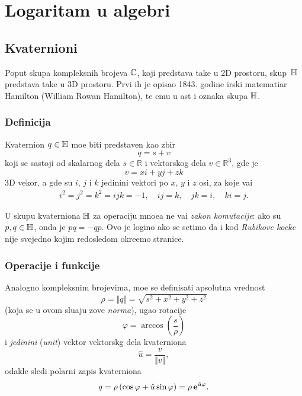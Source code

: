 

\section{Logaritam u algebri}

\subsection{Kvaternioni}

\def\uv{{\hat u}}
\def\vp{{\vec v}}
\def\norm#1{{\Vert#1\Vert}}

Poput skupa kompleksnih brojeva ${\mathbb C}$, koji predstav{\lj}a ta{\cv}ke u 2D prostoru,
skup~${\mathbb H}$ predstav{\lj}a ta{\cv}ke u 3D prostoru. Prvi ih je opisao 
1843. godine irski ma\-te\-ma\-ti\-{\cv}ar
Hamilton (William Rowan Hamilton), te {\nj}emu u {\cv}ast i oznaka skupa ${\mathbb H}$.

\subsubsection{Definicija}

Kvaternion $q\in{\mathbb H}$ mo{\zv}e biti predstav{\lj}en kao zbir
\begin{equation}
    q=s+v
\end{equation}
koji se sastoji od skalarnog dela $s\in{\mathbb R}$ i vektorskog dela $v\in{\mathbb R}^3$, gde je
\begin{equation}
    v=xi+yj+zk
\end{equation}
3D vekor, a gde su $i$, $j$ i $k$ jedini{\cv}ni vektori po $x$, $y$ i $z$ osi,
za koje va{\zv}i
\begin{gather}    
    i^2=j^2=k^2=ijk=-1,\quad
    ij=k,\quad jk=i,\quad ki=j. 
\end{gather}

\danger U skupu kvaterniona ${\mathbb H}$ za operaciju mno{\zv}e{\nj}a ne va{\zv}i {\sl zakon komutacije}: ako su
$p,q\in{\mathbb H}$, onda je $pq=-qp$. Ovo je logi{\cv}no ako se setimo da i kod
{\sl Rubikove kocke\/} nije svejedno kojim redosledom okre{\cc}emo stranice.

\subsubsection{Operacije i funkcije}

Analogno kompleksnim brojevima, mo{\zv}e se definisati apsolutna vrednost
$$
\rho = \norm q = \sqrt{s^2+x^2+y^2+z^2}
$$
(koja se u ovom slu{\cv}aju zove {\sl norma\/}),
ugao rotacije
$$
\varphi = \arccos\left( \frac s\rho \right)
$$
i {\sl jedini{\cv}ni\/} ({\sl unit\/}) vektor vektorskg dela kvaterniona
$$
\uv = \frac v{\norm v},
$$
odakle sledi polarni zapis kvaterniona
\begin{equation}
    q
=\rho\,(\cos\varphi + \uv\sin\varphi)
=\rho\,\e^{\uv\varphi}.
\end{equation}

